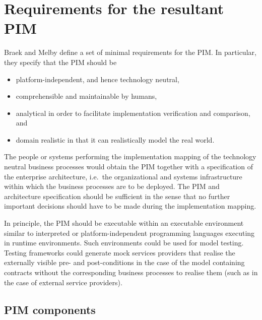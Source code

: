 
\section{Requirements for the resultant PIM}
\label{sec:pimRequirements}

Braek and Melby \cite{braek:modelDrivenServiceEngineering} define a set
of minimal requirements for the PIM. In particular, they specify that the
PIM should be
\begin{itemize}
  \item platform-independent, and hence technology neutral,
  \item comprehensible and maintainable by humans,
  \item analytical in order to facilitate implementation verification and
comparison, and
  \item domain realistic in that it can realistically model the real world.
\end{itemize}

The people or systems performing the implementation mapping of the
technology neutral business processes would obtain the PIM together
with a specification of the enterprise architecture, i.e.\ the organizational
and systems infrastructure within which the business processes are to be
deployed. The PIM and architecture specification should be sufficient
in the sense that no further important
decisions should have to be made during the implementation mapping.

In principle, the PIM should be executable within an executable environment
similar to interpreted or platform-independent programming languages executing
in runtime environments. Such environments could be used for model testing. 
Testing frameworks could generate mock services providers that realise the externally
visible pre- and post-conditions in the case of the model containing contracts without
the corresponding business processes to realise them (such as in the case of external
service providers).


\subsection{PIM components}

